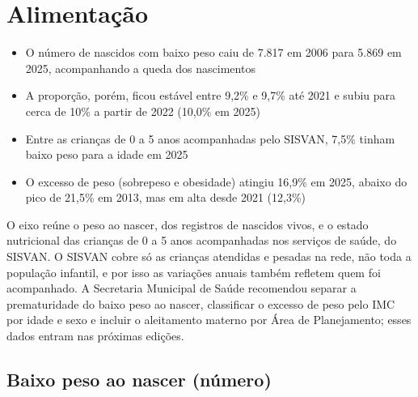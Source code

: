 
\chapter{Alimentação}\label{cap:eixo-6}

\begin{achados}\begin{itemize}

\item O número de nascidos com baixo peso caiu de 7.817 em 2006 para 5.869 em 2025, acompanhando a queda dos nascimentos

\item A proporção, porém, ficou estável entre 9,2\% e 9,7\% até 2021 e subiu para cerca de 10\% a partir de 2022 (10,0\% em 2025)

\item Entre as crianças de 0 a 5 anos acompanhadas pelo SISVAN, 7,5\% tinham baixo peso para a idade em 2025

\item O excesso de peso (sobrepeso e obesidade) atingiu 16,9\% em 2025, abaixo do pico de 21,5\% em 2013, mas em alta desde 2021 (12,3\%)

\end{itemize}\end{achados}

O eixo reúne o peso ao nascer, dos registros de nascidos vivos, e o estado nutricional das crianças de 0 a 5 anos acompanhadas nos serviços de saúde, do SISVAN. O SISVAN cobre só as crianças atendidas e pesadas na rede, não toda a população infantil, e por isso as variações anuais também refletem quem foi acompanhado. A Secretaria Municipal de Saúde recomendou separar a prematuridade do baixo peso ao nascer, classificar o excesso de peso pelo IMC por idade e sexo e incluir o aleitamento materno por Área de Planejamento; esses dados entram nas próximas edições.

\section{Baixo peso ao nascer (número)}

